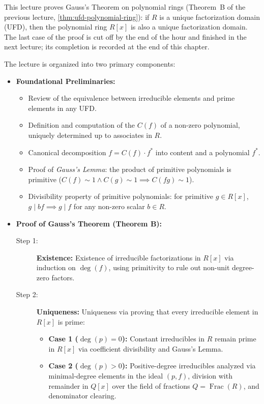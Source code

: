 \begin{overview}
This lecture proves Gauss's Theorem on polynomial rings (Theorem~B of the previous lecture, \cref{thm:ufd-polynomial-ring}): if $R$ is a unique factorization domain (UFD), then the polynomial ring $R[x]$ is also a unique factorization domain. The last case of the proof is cut off by the end of the hour and finished in the next lecture; its completion is recorded at the end of this chapter.

The lecture is organized into two primary components:
\begin{itemize}
    \item \textbf{Foundational Preliminaries:}
    \begin{itemize}
        \item Review of the equivalence between irreducible elements and prime elements in any UFD.
        \item Definition and computation of the  $C(f)$ of a non-zero polynomial, uniquely determined up to associates in $R$.
        \item Canonical decomposition $f = C(f) \cdot f^*$ into content and a  polynomial $f^*$.
        \item Proof of \emph{Gauss's Lemma}: the product of primitive polynomials is primitive ($C(f) \sim 1 \land C(g) \sim 1 \implies C(fg) \sim 1$).
        \item Divisibility property of primitive polynomials: for primitive $g \in R[x]$, $g \mid bf \implies g \mid f$ for any non-zero scalar $b \in R$.
    \end{itemize}
    \item \textbf{Proof of Gauss's Theorem (Theorem B):}
    \begin{description}
        \item[Step 1:] \textbf{Existence:} Existence of irreducible factorizations in $R[x]$ via induction on $\deg(f)$, using primitivity to rule out non-unit degree-zero factors.
        \item[Step 2:] \textbf{Uniqueness:} Uniqueness via proving that every irreducible element in $R[x]$ is prime:
        \begin{itemize}
            \item \textbf{Case 1 ($\deg(p) = 0$):} Constant irreducibles in $R$ remain prime in $R[x]$ via coefficient divisibility and Gauss's Lemma.
            \item \textbf{Case 2 ($\deg(p) > 0$):} Positive-degree irreducibles analyzed via minimal-degree elements in the ideal $(p, f)$, division with remainder in $Q[x]$ over the field of fractions $Q = \operatorname{Frac}(R)$, and denominator clearing.
        \end{itemize}
    \end{description}
\end{itemize}
\end{overview}

